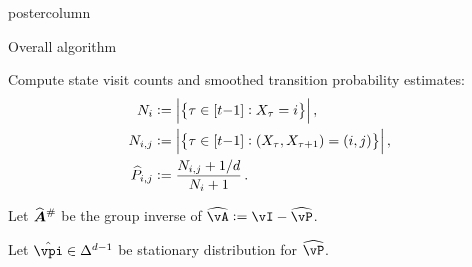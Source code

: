 \documentclass[notheorems,final]{beamer}
\newcommand{\compresslist}{%
  \setlength{\itemsep}{1pt}%
  \setlength{\parskip}{0pt}%
  \setlength{\parsep}{0pt}%
  \setlength{\leftmargin}{0.7cm}%
}
\newcommand\gap{\ensuremath{\gamma_{\star}}}
\newcommand\giAh{\ensuremath{\widehat{\boldsymbol{A}}^{\raisebox{-2.9pt}{$\scriptstyle\#$}}}}
\begin{document}
\begin{frame}{}
\begin{columns}
\begin{column}{0.24\textwidth}
\begin{beamercolorbox}[center,wd=\textwidth]{postercolumn}
\begin{minipage}[T]{.95\textwidth}
{%
%
%
%
%
%
%
%
%
%
%
              \begin{block}{Overall algorithm}
                \begin{algorithmic}[1]
                  \STATE Compute state visit counts and smoothed transition
                  probability estimates:
                  \begin{equation}
                    \begin{aligned}
                      N_i & :=
                      \Abs{
                        \Braces{
                          \tau \in [t{-}1] : X_\tau = i
                        }
                      }
                      \,, \\
                      N_{i,j} & :=
                      \Abs{
                        \Braces{
                          \tau \in [t{-}1] : (X_\tau,X_{\tau+1}) = (i,j)
                        }
                      }
                      \,, \\
                      \wh{P}_{i,j}
                      & :=
                      \frac{N_{i,j} + 1/d}{N_i + 1}
                      \,.
                    \end{aligned}
                    \notag
                  \end{equation}

                  \STATE Let $\giAh$ be the group inverse of $\wh\vA := \vI -
                  \wh\vP$.

                  \STATE Let $\hat\vpi \in \Delta^{d-1}$ be stationary
                  distribution for $\wh\vP$.


\end{algorithmic}
\end{block}}
\end{minipage}
\end{beamercolorbox}
\end{column}
\end{columns}
\end{frame}
\end{document}
